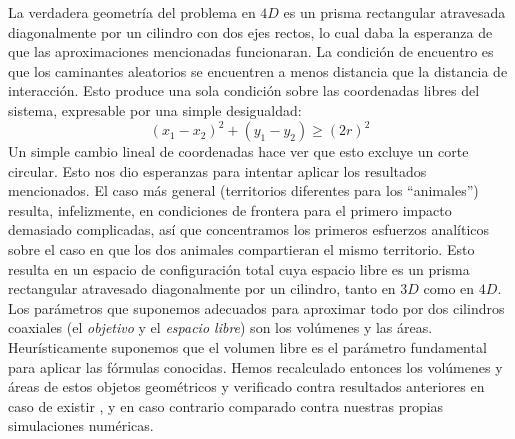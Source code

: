 \documentclass[letterpaperr,12pt]{article}
\begin{document}
La verdadera geometría del problema en $4D$ es un prisma rectangular
atravesada diagonalmente por un cilindro con dos ejes rectos,
lo cual daba la esperanza de que las aproximaciones mencionadas
funcionaran. La condición de encuentro es que los caminantes aleatorios
se encuentren a menos distancia que la distancia de interacción. Esto
produce una sola condición sobre las coordenadas libres del sistema, 
expresable por una simple desigualdad:
\begin{equation}
(x_1-x_2)^2+(y_1-y_2)\ge (2r)^2
\end{equation}
Un simple cambio lineal de coordenadas hace ver que
esto excluye un corte circular. Esto nos dio esperanzas para
intentar aplicar los resultados mencionados. El caso más general
(territorios diferentes para los ``animales'') resulta,
infelizmente, en condiciones de frontera para el primero
impacto demasiado complicadas, así que concentramos los primeros
esfuerzos analíticos sobre el caso en que los
dos animales compartieran el mismo territorio. 
Esto resulta en un espacio de configuración total cuya espacio
libre es un prisma rectangular atravesado diagonalmente
por un cilindro, tanto en $3D$ como en $4D$. Los parámetros
que suponemos adecuados para aproximar todo por dos
cilindros coaxiales (el \emph{objetivo} y el \emph{espacio libre})
son los volúmenes y las áreas. Heurísticamente suponemos que el 
volumen libre es el parámetro fundamental para aplicar 
las fórmulas conocidas. Hemos recalculado entonces
los volúmenes y áreas de estos objetos geométricos y verificado
contra resultados anteriores en caso de existir \cite{Munakata02},
y en caso contrario comparado contra nuestras propias 
simulaciones numéricas.
\end{document}
